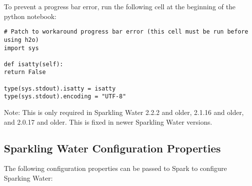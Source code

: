 To prevent a progress bar error, run the following cell at the beginning of the python notebook:

\begin{lstlisting}[style=Python]
# Patch to workaround progress bar error (this cell must be run before using h2o)
import sys

def isatty(self):
return False

type(sys.stdout).isatty = isatty
type(sys.stdout).encoding = "UTF-8"
\end{lstlisting}

Note: This is only required in Sparkling Water 2.2.2 and older, 2.1.16 and older, and 2.0.17 and older. This is
fixed in newer Sparkling Water versions.


\subsection{Sparkling Water Configuration Properties}
\label{sec:properties}
The following configuration properties can be passed to Spark to configure Sparking Water:

